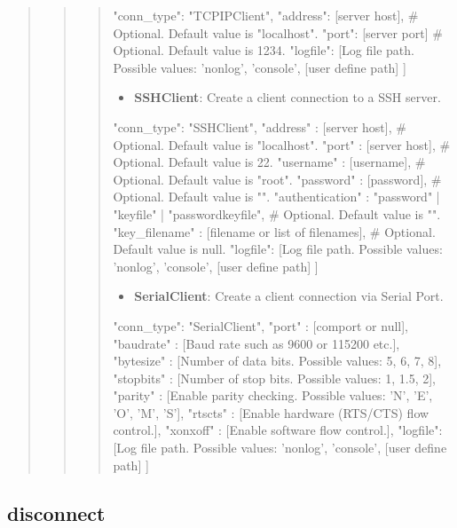 \begin{quote}
\begin{quote}
\begin{quote}
\begin{robotcode}
{
    "conn_type": "TCPIPClient",
    "address": [server host], # Optional. Default value is "localhost".
    "port": [server port]     # Optional. Default value is 1234.
    "logfile": [Log file path. Possible values: 'nonlog', 'console', [user define path] ]
 }
\end{robotcode}


\begin{itemize}
\tightlist
\item
  \textbf{SSHClient}: Create a client connection to a SSH server.
\end{itemize}


\begin{robotcode}
{
    "conn_type": "SSHClient",
    "address" : [server host],  # Optional. Default value is "localhost".
    "port" : [server host],     # Optional. Default value is 22.
    "username" : [username],    # Optional. Default value is "root".
    "password" : [password],    # Optional. Default value is "".
    "authentication" : "password" | "keyfile" | "passwordkeyfile",  # Optional. Default value is "".
    "key_filename" : [filename or list of filenames], # Optional. Default value is null.
    "logfile": [Log file path. Possible values: 'nonlog', 'console', [user define path] ]
 }
\end{robotcode}


\begin{itemize}
\tightlist
\item
  \textbf{SerialClient}: Create a client connection via Serial Port.
\end{itemize}


\begin{robotcode}
{
    "conn_type": "SerialClient",
    "port" : [comport or null],
    "baudrate" : [Baud rate such as 9600 or 115200 etc.],
    "bytesize" : [Number of data bits. Possible values: 5, 6, 7, 8],
    "stopbits" : [Number of stop bits. Possible values: 1, 1.5, 2],
    "parity" : [Enable parity checking. Possible values: 'N', 'E', 'O', 'M', 'S'],
    "rtscts" : [Enable hardware (RTS/CTS) flow control.],
    "xonxoff" : [Enable software flow control.],
    "logfile": [Log file path. Possible values: 'nonlog', 'console', [user define path] ]
 }
\end{robotcode}
\end{quote}
\end{quote}
\end{quote}
\hypertarget{description-disconnect}{%
\subsection{\texorpdfstring{\textbf{disconnect}}{disconnect}}\label{description-disconnect}}

